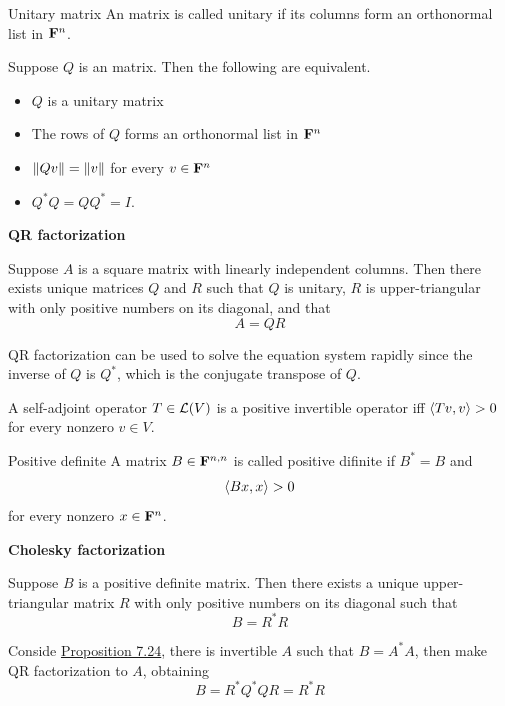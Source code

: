 \documentclass[12pt,a4paper]{article}
\begin{document}
    \begin{defi}{Unitary matrix}
        An  matrix is called unitary if its columns form an orthonormal list in $\mathbf{F}^n$.
    \end{defi}
    \begin{prop}
        Suppose $Q$ is an  matrix. Then the following are equivalent.
        \begin{itemize}
            \item $Q$ is a unitary matrix
            \item The rows of $Q$ forms an orthonormal list in $\mathbf{F}^n$
            \item $\left\lVert Qv\right\rVert=\left\lVert v\right\rVert$ for every $v\in\mathbf{F}^n$
            \item $Q^*Q=QQ^*=I$.
        \end{itemize}
    \end{prop}
    \hfill

    \begin{prop}
        \textbf{QR factorization}

        Suppose $A$ is a square matrix with linearly independent columns. Then there exists unique matrices $Q$ and $R$ such that $Q$ is unitary, $R$ is upper-triangular with only positive numbers on its diagonal, and that
        $$
        A=QR
        $$
    \end{prop}
    \begin{remark}
        QR factorization can be used to solve the equation system rapidly since the inverse of $Q$ is $Q^*$, which is the conjugate transpose of $Q$.
    \end{remark}
    \hfill

    \begin{prop}
        A self-adjoint operator $T\in\mathcal{L}(V)$ is a positive invertible operator iff $\langle Tv,v\rangle>0$ for every nonzero $v\in V$.
    \end{prop}
    \begin{defi}{Positive definite}
        A matrix $B\in\mathbf{F}^{n,n}$ is called positive difinite if $B^*=B$ and 
        $$
        \langle Bx,x\rangle>0
        $$
        for every nonzero $x\in\mathbf{F}^n$.
    \end{defi}
    \hfill

    \begin{prop}
        \textbf{Cholesky factorization}

        Suppose $B$ is a positive definite matrix. Then there exists a unique upper-triangular matrix $R$ with only positive numbers on its diagonal such that
        $$
        B=R^*R
        $$
    \end{prop}
    \begin{remark}
        Conside \hyperref[7.24]{Proposition 7.24}, there is invertible $A$ such that $B=A^*A$, then make QR factorization to $A$, obtaining 
        $$
        B=R^*Q^*QR=R^*R
        $$
    \end{remark}
    \hfill
\end{document}
